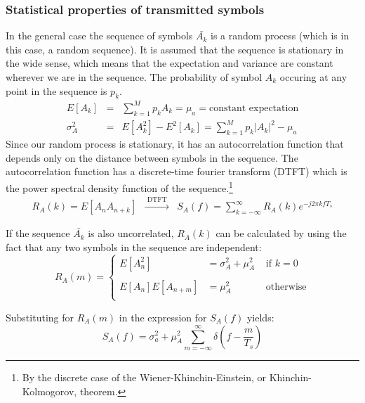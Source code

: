 \documentclass[onecolumn,x11names,technote,twoside,a4paper,10pt,english]{IEEEtran}
\begin{document}
\subsubsection{Statistical properties of transmitted symbols}
\label{sec:stat-symbs}

In the general case the sequence of symbols $\bar{A_k}$ is a random process (which is in this case, a random sequence). It is assumed that the sequence is stationary in the wide sense, which means that the expectation and variance are constant wherever we are in the sequence. The probability of symbol $A_k$ occuring at any point in the sequence is $p_k$. 
\begin{eqnarray*}
  E\left[A_k\right] &=& \sum_{k=1}^M{p_k A_k} = \mu_a = \text{constant expectation} \\
  \sigma_A^2 &=& E\left[A_k^2\right] - E^2\left[A_k\right] = \sum_{k=1}^M{p_k |A_k|^2} - \mu_a
\end{eqnarray*}
Since our random process is stationary, it has an autocorrelation function that depends only on the distance between symbols in the sequence. The autocorrelation function has a discrete-time fourier transform (DTFT) which is the power spectral density function of the sequence.\footnote{By the discrete case of the Wiener-Khinchin-Einstein, or Khinchin-Kolmogorov, theorem.}
\begin{eqnarray*}
  R_A(k) = E \left[ A_nA_{n+k} \right] &\xrightarrow{\mbox{ DTFT }}& S_A(f) = \sum_{k=-\infty}^{\infty} {R_A(k) e^{-j 2\pi k f T_s} }
\end{eqnarray*}

If the sequence $\bar{A_k}$ is also uncorrelated, $R_A(k)$ can be calculated by using the fact that any two symbols in the sequence are independent:
\begin{equation*}
  R_A(m) = \left\{ \begin{array}{rll} E\left[A_n^2\right] &= \sigma_A^2 + \mu_A^2 &\mbox{ if $k=0$} \\
      \\
                                     E\left[A_n\right]E\left[A_{n+m}\right] &= \mu_A^2 &\mbox{ otherwise} \\
                   \end{array} \right.
\end{equation*}

Substituting for $R_A(m)$ in the expression for $S_A(f)$ yields:
\begin{equation*}
  S_A(f) = \sigma_a^2 + \mu_A^2 \sum_{m=-\infty}^{\infty}{\delta(f - \frac{m}{T_s})}
\end{equation*}
\end{document}
